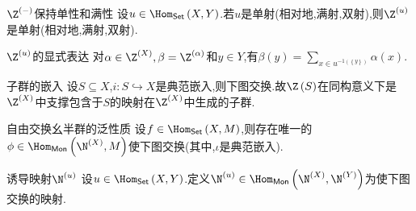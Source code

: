 \begin{proposition}{$\Z^{\left(-\right)}$保持单性和满性}{}
	设$u\in\Hom_{\mathsf{Set}}\left(X,Y\right)$.若$u$是单射(相对地,满射,双射),则$\Z^{\left(u\right)}$是单射(相对地,满射,双射).
\end{proposition}

\begin{proposition}{$\Z^{\left(u\right)}$的显式表达}{}
	对$\alpha\in\Z^{\left(X\right)},\beta=\Z^{\left(\alpha\right)}$和$y\in Y$,有$\beta\left(y\right)=\sum\limits_{x\in u^{-1\left(\left\{y\right\}\right)}}\alpha\left(x\right)$.
\end{proposition}

\begin{proposition}{子群的嵌入}{}
	设$S\subseteq X$,$i:S\hookrightarrow X$是典范嵌入,则下图交换.故$\Z\left(S\right)$在同构意义下是$\Z^{\left(X\right)}$中支撑包含于$S$的映射在$\Z^{\left(X\right)}$中生成的子群.
	\begin{center}
	\end{center}
\end{proposition}

\begin{proposition}{自由交换幺半群的泛性质}{}
	设$f\in\Hom_{\mathsf{Set}}\left(X,M\right)$,则存在唯一的$\phi\in\Hom_{\mathsf{Mon}}\left(\N^{\left(X\right)},M\right)$使下图交换(其中,$\iota$是典范嵌入).
	\begin{center}
	\end{center}
\end{proposition}

\begin{definition}{诱导映射$\N^{\left(u\right)}$}{}
	设$u\in\Hom_{\mathsf{Set}}\left(X,Y\right)$.定义$\N^{\left(u\right)}\in\Hom_{\mathsf{Mon}}\left(\N^{\left(X\right)},\N^{\left(Y\right)}\right)$为使下图交换的映射.
	\begin{center}
	\end{center}
\end{definition}

